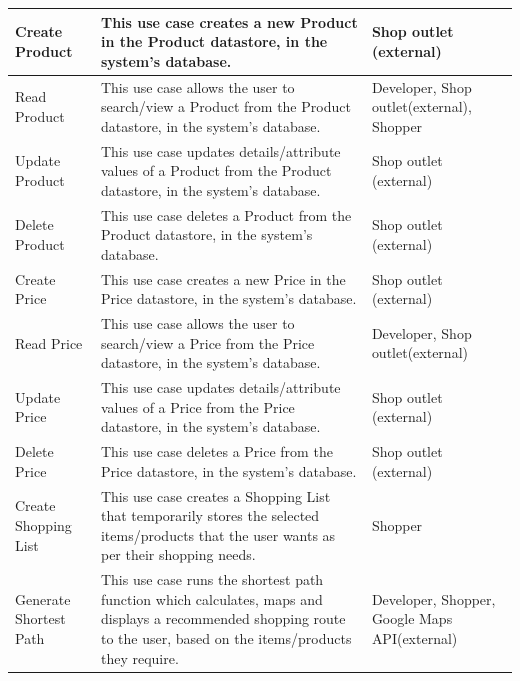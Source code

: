 \documentclass[12pt]{article}
\begin{document}
\begin{tabu} to \textwidth{| X[c] | X[c] | X[c] |} \hline
Create Product & This use case creates a new Product in the Product datastore, in the system's database. & Shop outlet (external)\\
\hline
Read Product & This use case allows the user to search/view a Product from the Product datastore, in the system's database. & Developer, Shop outlet(external), Shopper\\
\hline
Update Product & This use case updates details/attribute values of a Product from the Product datastore, in the system's database. & Shop outlet (external)\\
\hline
Delete Product & This use case deletes a Product from the Product datastore, in the system's database. & Shop outlet (external)\\
\hline
Create Price & This use case creates a new Price in the Price datastore, in the system's database. & Shop outlet (external)\\
\hline
Read Price & This use case allows the user to search/view a Price from the Price datastore, in the system's database. & Developer, Shop outlet(external)\\
\hline
Update Price & This use case updates details/attribute values of a Price from the Price datastore, in the system's database. & Shop outlet (external)\\
\hline
Delete Price & This use case deletes a Price from the Price datastore, in the system's database. & Shop outlet (external)\\
\hline
Create Shopping List & This use case creates a Shopping List that temporarily stores the selected items/products that the user wants as per their shopping needs. & Shopper\\
\hline
Generate Shortest Path & This use case runs the shortest path function which calculates, maps and displays a recommended shopping route to the user, based on the items/products they require. & Developer, Shopper, Google Maps API(external)\\
\hline
\end{tabu}
\end{document}

